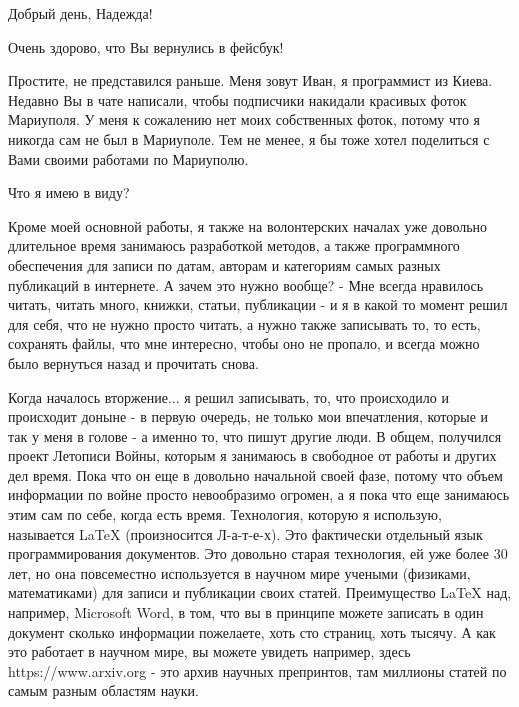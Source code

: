  
 
 
 
 

Добрый день, Надежда!

Очень здорово, что Вы вернулись в фейсбук!

Простите, не представился раньше. Меня зовут Иван, я программист из Киева.
Недавно Вы в чате написали, чтобы подписчики накидали красивых фоток Мариуполя.
У меня к сожалению нет моих собственных фоток, потому что я никогда сам не был
в Мариуполе.  Тем не менее, я бы тоже хотел поделиться с Вами своими работами
по Мариуполю.

Что я имею в виду?

Кроме моей основной работы, я также на волонтерских началах уже довольно
длительное время занимаюсь разработкой методов, а также программного
обеспечения для записи по датам, авторам и категориям самых разных публикаций в
интернете. А зачем это нужно вообще? - Мне всегда нравилось читать, читать
много, книжки, статьи, публикации - и я в какой то момент решил для себя, что
не нужно просто читать, а нужно также записывать то, то есть, сохранять файлы,
что мне интересно, чтобы оно не пропало, и всегда можно было вернуться назад и
прочитать снова.

Когда началось вторжение... я решил записывать, то, что происходило и происходит
доныне - в первую очередь, не только мои впечатления, которые и так у меня в
голове - а именно то, что пишут другие люди. В общем, получился проект Летописи
Войны, которым я занимаюсь в свободное от работы и других дел время. Пока что
он еще в довольно начальной своей фазе, потому что объем информации по войне
просто невообразимо огромен, а я пока что еще занимаюсь этим сам по себе, когда
есть время.  Технология, которую я использую, называется LaTeX (произносится
Л-а-т-е-х). Это фактически отдельный язык программирования документов. Это
довольно старая технология, ей уже более 30 лет, но она повсеместно
используется в научном мире учеными (физиками, математиками) для записи и
публикации своих статей.  Преимущество LaTeX над, например, Microsoft Word, в
том, что вы в принципе можете записать в один документ сколько информации
пожелаете, хоть сто страниц, хоть тысячу. А как это работает в научном мире, вы
можете увидеть например, здесь https://www.arxiv.org - это архив научных
препринтов, там миллионы статей по самым разным областям науки.

